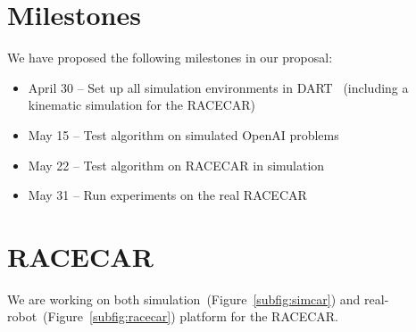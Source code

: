 \documentclass{article}
\newcommand{\figref}[1]{Figure~\ref{#1}}%
\begin{document}
\section{Milestones}
We have proposed the following milestones in our proposal:
\begin{itemize}
\item April 30 -- Set up all simulation environments in DART~\cite{lee2018dart} (including a kinematic simulation for the RACECAR)
\item May 15   -- Test algorithm on simulated OpenAI problems
\item May 22   -- Test algorithm on RACECAR in simulation
\item May 31   -- Run experiments on the real RACECAR
\end{itemize}

\section{RACECAR}
We are working on both simulation~(\figref{subfig:simcar}) and real-robot~(\figref{subfig:racecar}) platform for the RACECAR.
\end{document}
